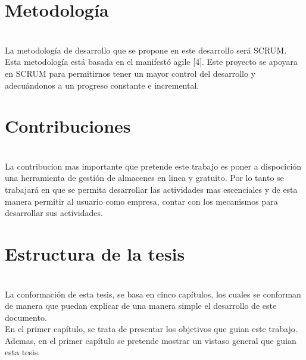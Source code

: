\section{Metodología}

\\
La metodología de desarrollo que se propone en este desarrollo será SCRUM. Esta metodología está basada en el manifestó agile [4]. Este proyecto se apoyara en SCRUM para permitirnos tener un mayor control del desarrollo y adecuándonos a un progreso constante e incremental.\\


\section{Contribuciones}

\\
La contribucion mas importante que pretende este trabajo es poner a dispocición una herramienta de gestión de almacenes en linea y gratuito. Por lo tanto se trabajará en que se permita desarrollar las actividades mas escenciales y de esta manera permitir al usuario como empresa, contar con los mecanismos para desarrollar sus actividades.\\


\section{Estructura de la tesis}

\\
La conformación de esta tesis, se basa en cinco capítulos, los cuales se conforman de manera que puedan explicar de una manera simple el desarrollo de este documento.\\

En el primer capítulo, se trata de presentar los objetivos que guian este trabajo. Ademas, en el primer capítulo se pretende mostrar un vistaso general que guian esta tesis.\\

